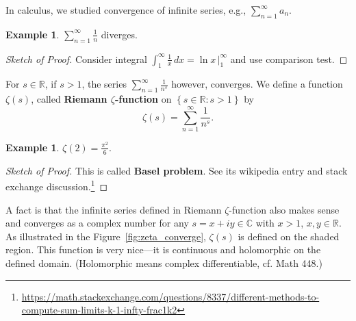 \documentclass{amsbook}
\theoremstyle{plain}
\theoremstyle{definition}
\newtheorem{example}[theorem]{Example}
\theoremstyle{remark}
\numberwithin{equation}{chapter}
\numberwithin{figure}{chapter}
\newcommand{\R}{\mathbb{R}}
\newcommand{\C}{\mathbb{C}}
\begin{document}
In calculus, we studied convergence of infinite series, e.g., $\sum_{n = 1}^\infty a_n$.
\begin{example}
$\sum_{n = 1}^\infty \frac{1}n$ diverges. 
\end{example}
\begin{proof}[Sketch of Proof]\renewcommand*{\qedsymbol}{\ensuremath{\blacksquare}}
Consider integral $\int_1^\infty \frac{1}x \, dx = \ln x \,|_1^\infty$ and use comparison test.
\end{proof}
For $s \in \R$, if $s > 1$, the series $\sum_{n = 1}^\infty \frac{1}{n^s}$ however, converges. We define a function $\zeta (s)$, called \textbf{Riemann $\zeta$-function} on $\left\{ s \in \R : s > 1 \right\}$ by 
\[
\zeta (s) = \sum_{n = 1}^\infty \frac{1}{n^s}.
\]
\begin{example}
$\zeta (2) = \frac{ \pi^2 }6$.
\end{example}
\begin{proof}[Sketch of Proof]\renewcommand*{\qedsymbol}{\ensuremath{\blacksquare}}
  This is called \textbf{Basel problem}. See its wikipedia entry and stack exchange discussion.\footnote{\url{https://math.stackexchange.com/questions/8337/different-methods-to-compute-sum-limits-k-1-infty-frac1k2}}
\end{proof}
A fact is that the infinite series defined in Riemann $\zeta$-function also makes sense and converges as a complex number for any $s = x + i y \in \C$ with $x > 1$, $x, y \in \R$. As illustrated in the Figure~\ref{fig:zeta_converge}, $\zeta(s)$ is defined on the shaded region. This function is very nice---it is continuous and holomorphic on the defined domain. (Holomorphic means complex differentiable, cf. Math 448.)
\end{document}
